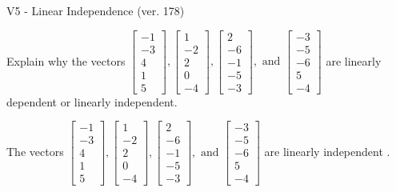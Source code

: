 \begin{exercise}
  \begin{exerciseTitle}V5 - Linear Independence (ver. 178)\end{exerciseTitle}
  \begin{exerciseStatement}
    Explain why the vectors \(\left[\begin{array}{r}
-1 \\
-3 \\
4 \\
1 \\
5
\end{array}\right] , \left[\begin{array}{r}
1 \\
-2 \\
2 \\
0 \\
-4
\end{array}\right] , \left[\begin{array}{r}
2 \\
-6 \\
-1 \\
-5 \\
-3
\end{array}\right] , \text{ and } \left[\begin{array}{r}
-3 \\
-5 \\
-6 \\
5 \\
-4
\end{array}\right]\) are linearly dependent or linearly independent.	


  \end{exerciseStatement}
  \begin{exerciseAnswer}
   The vectors \(\left[\begin{array}{r}
-1 \\
-3 \\
4 \\
1 \\
5
\end{array}\right] , \left[\begin{array}{r}
1 \\
-2 \\
2 \\
0 \\
-4
\end{array}\right] , \left[\begin{array}{r}
2 \\
-6 \\
-1 \\
-5 \\
-3
\end{array}\right] , \text{ and } \left[\begin{array}{r}
-3 \\
-5 \\
-6 \\
5 \\
-4
\end{array}\right]\) are 
  	 linearly independent  .
  


  \end{exerciseAnswer}
\end{exercise}
